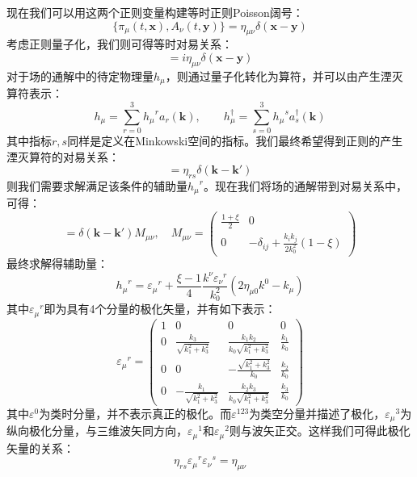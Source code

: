 现在我们可以用这两个正则变量构建等时正则Poisson阔号：
\begin{equation}
\{\pi_\mu(t,\boldsymbol{x}),A_\nu(t,\boldsymbol{y})\}=\eta_{\mu\nu}\delta(\boldsymbol{x}-\boldsymbol{y})
\end{equation}
考虑正则量子化，我们则可得等时对易关系：
\begin{equation}
[A_\mu(t,\boldsymbol{x}),\pi_\nu(t,\boldsymbol{y})]=i\eta_{\mu\nu}\delta(\boldsymbol{x}-\boldsymbol{y})
\end{equation}
对于场的通解中的待定物理量$h_\mu$，则通过量子化转化为算符，并可以由产生湮灭算符表示：
\begin{equation}
h_\mu=\sum^3_{r=0} {h_\mu}^r a_r(\boldsymbol{k}),\qquad h^\dagger_\mu=\sum^3_{s=0}{h_\mu}^s a^\dagger_s(\boldsymbol{k})
\end{equation}
其中指标$r,s$同样是定义在Minkowski空间的指标。我们最终希望得到正则的产生湮灭算符的对易关系：
\begin{equation}
[a_r(\boldsymbol{k}),a^\dagger_s(\boldsymbol{k}')]=\eta_{rs}\delta(\boldsymbol{k}-\boldsymbol{k}')
\end{equation}
则我们需要求解满足该条件的辅助量${h_\mu}^r$。现在我们将场的通解带到对易关系中，可得：
\begin{equation}
[h_\mu(\boldsymbol{k}),h^\dagger_\nu(\boldsymbol{k})]=\delta(\boldsymbol{k}-\boldsymbol{k}')M_{\mu\nu},\quad M_{\mu\nu}=\begin{pmatrix}
\frac{1+\xi}{2}&	0\\	0&	-\delta_{ij}+\frac{k_i k_j}{2k_0^2}(1-\xi)
\end{pmatrix}
\end{equation}
最终求解得辅助量：
\begin{equation}
{h_\mu}^r={\varepsilon_\mu}^r+\frac{\xi-1}{4}\frac{k^\nu{\varepsilon_\nu}^r}{k_0^2}(2\eta_{\mu 0}k^0-k_\mu)
\end{equation}
其中${\varepsilon_\mu}^r$即为具有4个分量的极化矢量，并有如下表示：
\begin{equation}
{\varepsilon_\mu}^r=\begin{pmatrix}
1&	0&	0&	0\\
0&	\frac{k_3}{\sqrt{k_1^2+k_3^2}}&	\frac{k_1k_2}{k_0\sqrt{k_1^2+k_3^2}}&	\frac{k_1}{k_0}\\
0&	0&	-\frac{\sqrt{k_1^2+k_3^2}}{k_0}&	\frac{k_2}{k_0}\\
0&	-\frac{k_1}{\sqrt{k_1^2+k_3^2}}&	\frac{k_2k_3}{k_0\sqrt{k_1^2+k_3^2}}&	\frac{k_3}{k_0}
\end{pmatrix}
\end{equation}
其中$\varepsilon^0$为类时分量，并不表示真正的极化。而$\varepsilon^{123}$为类空分量并描述了极化，${\varepsilon_\mu}^3$为纵向极化分量，与三维波矢同方向，${\varepsilon_\mu}^1$和${\varepsilon_\mu}^2$则与波矢正交。这样我们可得此极化矢量的关系：
\begin{equation}
\eta_{rs}{\varepsilon_\mu}^r{\varepsilon_\nu}^s=\eta_{\mu\nu}
\label{eq:phopolsum}
\end{equation}

